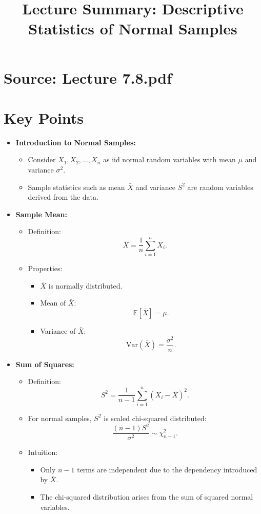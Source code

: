 \documentclass{article}
\title{Lecture Summary: Descriptive Statistics of Normal Samples}
\author{}
\date{}
\begin{document}
\maketitle

\section*{Source: Lecture 7.8.pdf}

\section*{Key Points}

\begin{itemize}
  \item \textbf{Introduction to Normal Samples:}
    \begin{itemize}
      \item Consider $X_1, X_2, \dots, X_n$ as iid normal random variables with mean $\mu$ and variance $\sigma^2$.
      \item Sample statistics such as mean $\bar{X}$ and variance $S^2$ are random variables derived from the data.
    \end{itemize}

  \item \textbf{Sample Mean:}
    \begin{itemize}
      \item Definition:
        \[
          \bar{X} = \frac{1}{n} \sum_{i=1}^n X_i.
        \]
      \item Properties:
        \begin{itemize}
          \item $\bar{X}$ is normally distributed.
          \item Mean of $\bar{X}$:
            \[
              \mathbb{E}[\bar{X}] = \mu.
            \]
          \item Variance of $\bar{X}$:
            \[
              \text{Var}(\bar{X}) = \frac{\sigma^2}{n}.
            \]
        \end{itemize}
    \end{itemize}

  \item \textbf{Sum of Squares:}
    \begin{itemize}
      \item Definition:
        \[
          S^2 = \frac{1}{n-1} \sum_{i=1}^n (X_i - \bar{X})^2.
        \]
      \item For normal samples, $S^2$ is scaled chi-squared distributed:
        \[
          \frac{(n-1)S^2}{\sigma^2} \sim \chi^2_{n-1}.
        \]
      \item Intuition:
        \begin{itemize}
          \item Only $n-1$ terms are independent due to the dependency introduced by $\bar{X}$.
          \item The chi-squared distribution arises from the sum of squared normal variables.
        \end{itemize}
    \end{itemize}


\end{itemize}
\end{document}
